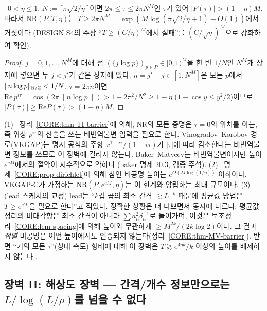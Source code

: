\begin{proposition}\label{CORE:prop-dirichlet}
\PROVED\ $0<\eta\le1$, $N:=\lceil\pi\sqrt{2/\eta}\,\rceil$이면 $2\pi\le\tau\le2\pi N^M$인 $\tau$가 있어 $|P(\tau)|>(1-\eta)M$. 따라서 $\mathrm{NR}(P,T,\eta)$는 $T\ge2\pi N^M=\exp(M\log(\pi\sqrt{2/\eta}+1)+O(1))$에서 거짓이다 (DESIGN S4의 주장 ``$T\ge(C/\eta)^M$에서 실패''를 $(C/\sqrt\eta)^M$으로 강화하여 확인).
\end{proposition}
\begin{proof}
$j=0,1,\dots,N^M$에 대해 점 $(\{j\log p\})_{p\in P}\in[0,1)^M$을 한 변 $1/N$인 $N^M$개 상자에 넣으면 두 $j<j'$가 같은 상자에 있다. $n=j'-j\in[1,N^M]$은 모든 $p$에서 $\|n\log p\|_{\mathbb{R}/\mathbb{Z}}<1/N$. $\tau=2\pi n$이면 $\mathrm{Re}\,p^{i\tau}=\cos(2\pi\|n\log p\|)>1-2\pi^2/N^2\ge1-\eta$ ($1-\cos y\le y^2/2$)이므로 $|P(\tau)|\ge\mathrm{Re}P(\tau)>(1-\eta)M$.
\end{proof}

\begin{remark}[의미와 교정]\label{CORE:rem-barrier1}
(1) \PROVED\ 정리~\ref{CORE:thm-TI-barrier}에 의해, $\mathrm{NR}$의 모든 증명은 $\tau=0$의 위치를 아는, 즉 위상 $p^{i\tau}$의 산술을 쓰는 비번역불변 입력을 필요로 한다. Vinogradov–Korobov 경로(VKGAP)는 명시 공식의 주항 $x^{1-i\tau}/(1-i\tau)$가 $|\tau|$에 따라 감소한다는 비번역불변 정보를 쓰므로 이 장벽에 걸리지 않는다. Baker–Matveev는 비번역불변이지만 높이 $e^{cM}$에서의 절약이 지수적으로 약하다 (baker 명제 20.3, 검증 주석).
(2) \PROVED\ 명제~\ref{CORE:prop-dirichlet}에 의해 참인 비공명 높이는 $e^{O(M\log(1/\eta))}$ 이하이다. VKGAP-C가 가정하는 $\mathrm{NR}(P,e^{cM},\eta)$는 이 한계와 양립하는 최대 규모이다.
(3) (lead 스케치의 교정) lead는 ``$k$겹 곱의 최소 간격 $\gtrsim L^{-k}$ 때문에 평균값 방법은 $T\ge e^{c'L}$을 필요로 한다''고 적었다. 정확한 상황은 더 나쁘면서 동시에 다르다: 평균값 정리의 비대각항은 최소 간격이 아니라 $\sum a_n^2\delta_n^{-1}$로 들어가며, 이것은 보조정리~\ref{CORE:lem-spacing}에 의해 높이와 무관하게 $\ge M^{2k}/(2k\log2)$이다. 그 결과 \emph{점별} 비공명은 어떤 높이에서도 인증되지 않는다(정리~\ref{CORE:thm-MV-barrier}). 반면 ``거의 모든 $\tau$''(상대 측도) 형태에 대해 이 장벽은 $T\gtrsim e^{4\eta k}/k$ 이상의 높이를 배제하지 않는다 \HEUR.
\end{remark}

\subsection{장벽 II: 해상도 장벽 --- 간격/개수 정보만으로는 $L/\log(L/\rho)$를 넘을 수 없다}
\label{CORE:ssec-barrier2}

